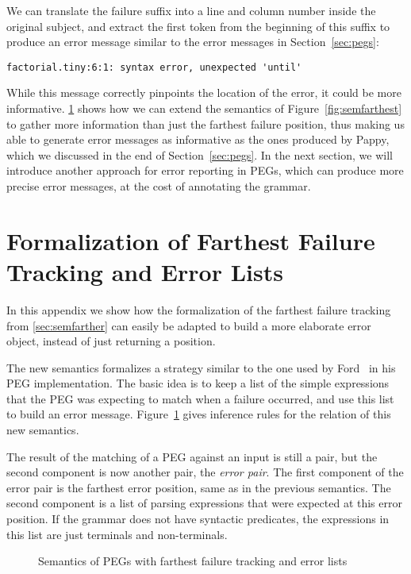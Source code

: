 \documentclass[3p,12pt,singlecolumn]{elsarticle}
\begin{document}
We can translate the failure suffix into a line and column
number inside the original subject, and extract the
first token from the beginning of this suffix to
produce an error message similar to the error messages
in Section~\ref{sec:pegs}:

\begin{verbatim}
factorial.tiny:6:1: syntax error, unexpected 'until'
\end{verbatim}

While this message correctly pinpoints the location
of the error, it could be more informative.
\ref{sec:fartherandlist} shows how we can
extend the semantics of Figure~\ref{fig:semfarthest}
to gather more information than just the farthest
failure position, thus making us able to generate
error messages as informative as the ones produced by Pappy,
which we discussed in the end of Section~\ref{sec:pegs}.
In the next section, we will introduce another approach
for error reporting in PEGs, which can produce more precise
error messages, at the cost of annotating the grammar.

\section{Formalization of Farthest Failure Tracking and Error Lists}
\label{sec:fartherandlist}

In this appendix we show how the formalization of the farthest failure tracking
from \ref{sec:semfarther} can easily be adapted
to build a more elaborate error object, instead of just returning a position.

The new semantics formalizes a strategy similar to
the one used by Ford~\citep{ford2002packrat} in his
PEG implementation. The basic idea is to keep a list of
the simple expressions that the PEG was expecting to match when
a failure occurred, and use this list to build
an error message. Figure~\ref{fig:semfarthestjoin}
gives inference rules for the  relation of
this new semantics.

The result of the matching of a PEG  against an input 
is still a pair, but the second component is now
another pair, the {\em error pair}.
The first component of the error pair is the farthest
error position, same as in the previous semantics.
The second component is a list of parsing expressions
that were expected at this error position.
If the grammar does not have syntactic predicates,
the expressions in this list are just terminals and
non-terminals.

\begin{figure}[p]
{\small

}
\caption{Semantics of PEGs with farthest failure tracking and error lists}
\label{fig:semfarthestjoin}
\end{figure}
\end{document}
